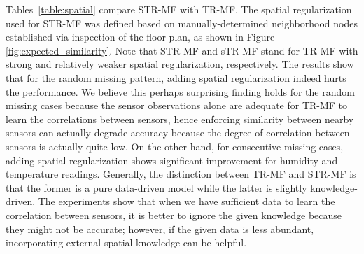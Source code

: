 
Tables~\ref{table:spatial} compare STR-MF with TR-MF.
The spatial regularization used for STR-MF was defined based on manually-determined neighborhood nodes established via inspection of the floor plan, as shown in Figure \ref{fig:expected_similarity}.
Note that STR-MF and sTR-MF stand for TR-MF with strong and relatively weaker spatial regularization, respectively.
The results show that for the random missing pattern, adding spatial regularization indeed hurts the performance.
We believe this perhaps surprising finding holds for the random missing cases because the sensor observations alone are adequate for TR-MF to learn the correlations between sensors, hence enforcing similarity between nearby sensors can actually degrade accuracy because the degree of correlation between sensors is actually quite low.
On the other hand, for consecutive missing cases, adding spatial regularization shows significant improvement for humidity and temperature readings.
Generally, the distinction between TR-MF and STR-MF is that the former is a pure data-driven model while the latter is slightly knowledge-driven.
The experiments show that when we have sufficient data to learn the correlation between sensors, it is better to ignore the given knowledge because they might not be accurate; however, if the given data is less abundant, incorporating external spatial knowledge can be helpful.


